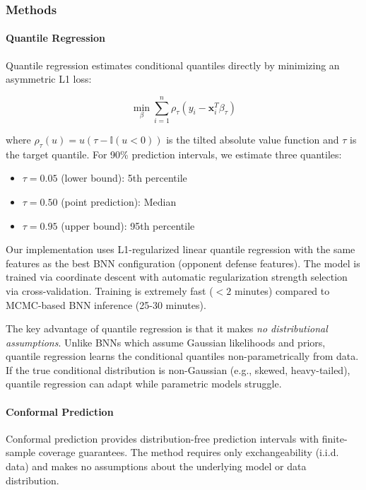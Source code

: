 \subsubsection{Methods}

\paragraph{Quantile Regression}

Quantile regression \citep{koenker1978regression} estimates conditional quantiles directly by minimizing an asymmetric L1 loss:

\begin{equation}
    \min_{\beta} \sum_{i=1}^{n} \rho_{\tau}(y_i - \mathbf{x}_i^T \beta_{\tau})
\end{equation}

where $\rho_{\tau}(u) = u(\tau - \mathbb{I}(u < 0))$ is the tilted absolute value function and $\tau$ is the target quantile. For 90\% prediction intervals, we estimate three quantiles:

\begin{itemize}
    \item $\tau = 0.05$ (lower bound): 5th percentile
    \item $\tau = 0.50$ (point prediction): Median
    \item $\tau = 0.95$ (upper bound): 95th percentile
\end{itemize}

Our implementation uses L1-regularized linear quantile regression with the same features as the best BNN configuration (opponent defense features). The model is trained via coordinate descent with automatic regularization strength selection via cross-validation. Training is extremely fast ($<2$ minutes) compared to MCMC-based BNN inference (25-30 minutes).

The key advantage of quantile regression is that it makes \textit{no distributional assumptions}. Unlike BNNs which assume Gaussian likelihoods and priors, quantile regression learns the conditional quantiles non-parametrically from data. If the true conditional distribution is non-Gaussian (e.g., skewed, heavy-tailed), quantile regression can adapt while parametric models struggle.

\paragraph{Conformal Prediction}

Conformal prediction \citep{vovk2005algorithmic, shafer2008tutorial} provides distribution-free prediction intervals with finite-sample coverage guarantees. The method requires only exchangeability (i.i.d. data) and makes no assumptions about the underlying model or data distribution.

